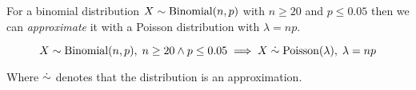 \begin{definition}
    For a binomial distribution $X \sim \mathrm{Binomial}(n, p)$ with $n \ge 20$ and $p \le 0.05$ then we can \textit{approximate} it with a Poisson distribution with $\lambda = np$.

    \begin{equation}
        X \sim \mathrm{Binomial}(n, p), \; n \ge 20 \land p \le 0.05 \implies X \mathrel{\dot\sim} \mathrm{Poisson}(\lambda), \; \lambda = n p
    \end{equation}

    Where $\mathrel{\dot\sim}$ denotes that the distribution is an approximation.
\end{definition}
